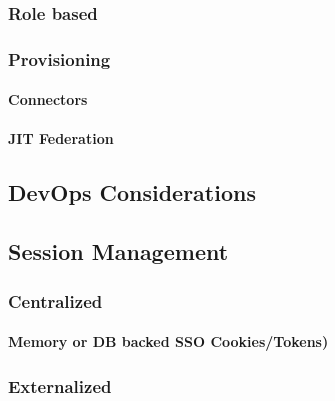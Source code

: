 \hypertarget{role-based}{%
\subsubsection{Role based}\label{role-based}}

\hypertarget{provisioning}{%
\subsubsection{Provisioning}\label{provisioning}}

\hypertarget{connectors}{%
\paragraph{Connectors}\label{connectors}}

\hypertarget{jit-federation}{%
\paragraph{JIT Federation}\label{jit-federation}}

\hypertarget{devops-considerations}{%
\subsection{DevOps Considerations}\label{devops-considerations}}

\hypertarget{session-management-1}{%
\subsection{Session Management}\label{session-management-1}}

\hypertarget{centralized}{%
\subsubsection{Centralized}\label{centralized}}

\hypertarget{memory-or-db-backed-sso-cookiestokens}{%
\paragraph{Memory or DB backed SSO
Cookies/Tokens)}\label{memory-or-db-backed-sso-cookiestokens}}

\hypertarget{externalized}{%
\subsubsection{Externalized}\label{externalized}}

